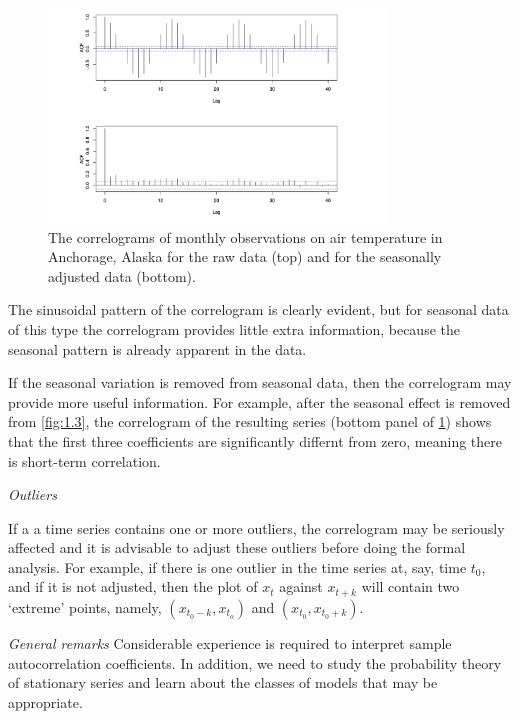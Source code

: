 \begin{figure}[ht]
	\centering
	\includegraphics[width=0.8\textwidth]{Chapter 2/fig2-8.png}
	\caption{The correlograms of monthly observations on air temperature in Anchorage, Alaska for the raw data (top) and for the seasonally adjusted data (bottom).}
	\label{fig:2.8}
\end{figure}

The sinusoidal pattern of the correlogram is clearly evident, but for seasonal data of this type the correlogram provides little extra information, because the seasonal pattern is already apparent in the data. 

If the seasonal variation is removed from seasonal data, then the correlogram may provide more useful information. For example, after the seasonal effect is removed from \cref{fig:1.3}, the correlogram of the resulting series (bottom panel of \cref{fig:2.8}) shows that the first three coefficients are significantly differnt from zero, meaning there is short-term correlation.

\textit{Outliers}

If a a time series contains one or more outliers, the correlogram may be seriously affected and it is advisable to adjust these outliers before doing the formal analysis. For example, if there is one outlier in the time series at, say, time $t_0$, and if it is not adjusted, then the plot of $x_t$ against $x_{t+k}$ will contain two `extreme' points, namely, $(x_{t_0 - k}, x_{t_o})$ and $(x_{t_0}, x_{t_0 + k})$.

\textit{General remarks}
Considerable experience is required to interpret sample autocorrelation coefficients. In addition, we need to study the probability theory of stationary series and learn about the classes of models that may be appropriate. 



